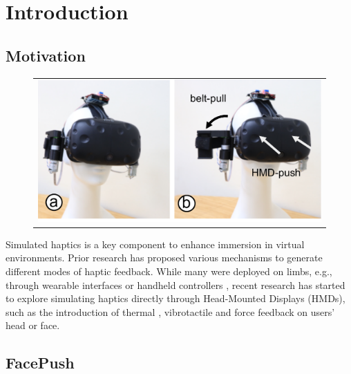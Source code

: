 \chapter{Introduction} \label{chapter:introduction}

\section{Motivation }

\begin{figure}[h]
    \begin{center}
        \begin{tabular}{@{\hspace{0.1cm}}c}
           \includegraphics[width=1\textwidth]{figures/FacePush.pdf}
        \end{tabular}
        \label{fig:FacePush Intro}
    \end{center}
\end{figure}

Simulated haptics is a key component to enhance immersion in virtual environments. Prior research has proposed various mechanisms to generate different modes of haptic feedback. While many were deployed on limbs, e.g., through wearable interfaces \cite{Impacto} or handheld controllers \cite{normalTouch, hapticLink}, recent research has started to explore simulating haptics directly through Head-Mounted Displays (HMDs),  such as the introduction of thermal \cite{ThermoVR, Ambiotherm}, vibrotactile \cite{HapticHead} and force \cite{GyroVR, HangerOVER} feedback on users' head or face.

\section{FacePush }

